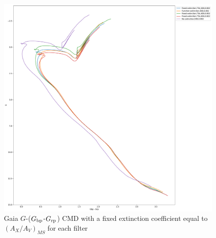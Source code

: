 \documentclass[12pt, a4paper]{report}
\begin{document}
\begin{figure}[h]
\begin{center}
\includegraphics[width=1.0\textwidth]{../basti_isochrones_10_13Gyr/Extinction_T5k_FeH0fix_func_G_GbpmGrp_500_400_600_Myr_FeH_0p002_ref_noext_Av_1p0.pdf}
\caption{Gaia $G$-($G_{\textnormal{bp}}$-$G_{\textnormal{rp}}$) CMD with a fixed extinction coefficient equal to $(A_{X}/A_{V})_{MS}$ for each filter}
\label{gaia_isoc_T5k}
\end{center}
\end{figure}
\end{document}
